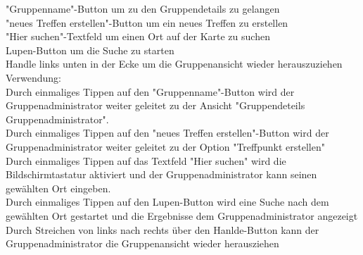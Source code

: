 "Gruppenname"-Button um zu den Gruppendetails zu gelangen\\
"neues Treffen erstellen"-Button um ein neues Treffen zu erstellen\\
"Hier suchen"-Textfeld um einen Ort auf der Karte zu suchen\\
Lupen-Button um die Suche zu starten\\
Handle links unten in der Ecke um die Gruppenansicht wieder herauszuziehen\\
[Kleinüberschrift]Verwendung:\\
Durch einmaliges Tippen auf den "Gruppenname"-Button wird der Gruppenadministrator weiter geleitet zu der Ansicht "Gruppendeteils Gruppenadministrator".\\
Durch einmaliges Tippen auf den "neues Treffen erstellen"-Button wird der Gruppenadministrator weiter geleitet zu der Option "Treffpunkt erstellen"\\
Durch einmaliges Tippen auf das Textfeld "Hier suchen" wird die Bildschirmtastatur aktiviert und der Gruppenadministrator kann seinen gewählten Ort eingeben.\\
Durch einmaliges Tippen auf den Lupen-Button wird eine Suche nach dem gewählten Ort gestartet und die Ergebnisse dem Gruppenadministrator angezeigt\\
Durch Streichen von links nach rechts über den Hanlde-Button kann der Gruppenadministrator die Gruppenansicht wieder herausziehen\\ \\

